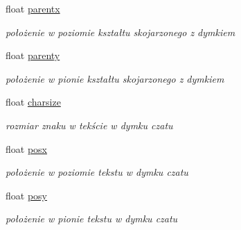 \begin{DoxyCompactItemize}
\item 
\mbox{\label{struct_speech_balloon_initializer_a8419d1198b6ff789c7f9459e81578d54}} 
float \mbox{\hyperlink{struct_speech_balloon_initializer_a8419d1198b6ff789c7f9459e81578d54}{parentx}}
\begin{DoxyCompactList}\small\item\em położenie w poziomie kształtu skojarzonego z dymkiem \end{DoxyCompactList}\item 
\mbox{\label{struct_speech_balloon_initializer_a3eac60566c2266fa6ca971e72d8a536e}} 
float \mbox{\hyperlink{struct_speech_balloon_initializer_a3eac60566c2266fa6ca971e72d8a536e}{parenty}}
\begin{DoxyCompactList}\small\item\em położenie w pionie kształtu skojarzonego z dymkiem \end{DoxyCompactList}\item 
\mbox{\label{struct_speech_balloon_initializer_ad0b2db6c4bad21a02f84216c9776a638}} 
float \mbox{\hyperlink{struct_speech_balloon_initializer_ad0b2db6c4bad21a02f84216c9776a638}{charsize}}
\begin{DoxyCompactList}\small\item\em rozmiar znaku w tekście w dymku czatu \end{DoxyCompactList}\item 
\mbox{\label{struct_speech_balloon_initializer_a7a68fdacd0533baca6a34ac8e9e7ef74}} 
float \mbox{\hyperlink{struct_speech_balloon_initializer_a7a68fdacd0533baca6a34ac8e9e7ef74}{posx}}
\begin{DoxyCompactList}\small\item\em położenie w poziomie tekstu w dymku czatu \end{DoxyCompactList}\item 
\mbox{\label{struct_speech_balloon_initializer_a09503f9839dd05aa2b56d44bdb5b1670}} 
float \mbox{\hyperlink{struct_speech_balloon_initializer_a09503f9839dd05aa2b56d44bdb5b1670}{posy}}
\begin{DoxyCompactList}\small\item\em położenie w pionie tekstu w dymku czatu \end{DoxyCompactList}\end{DoxyCompactItemize}


